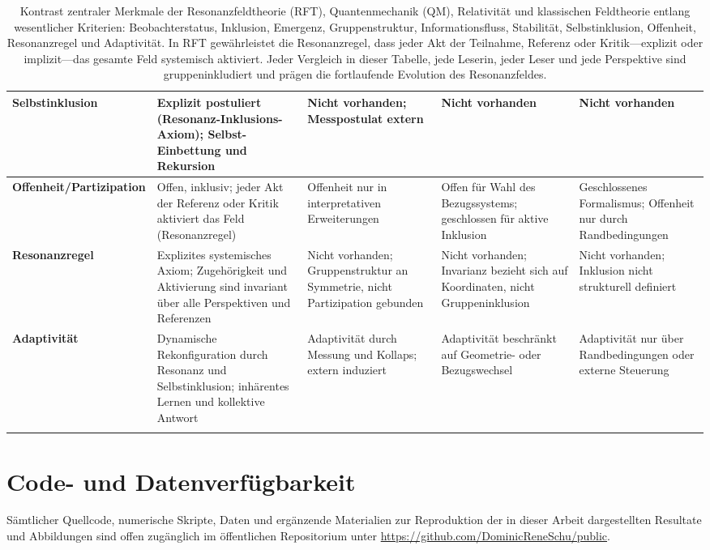 \documentclass[12pt]{article}
\begin{document}
\begin{center}
\begin{longtable}{|p{4cm}|p{3cm}|p{3cm}|p{3cm}|p{3cm}|}
		\hline
		\textbf{Selbstinklusion} & Explizit postuliert (Resonanz-Inklusions-Axiom); Selbst-Einbettung und Rekursion & Nicht vorhanden; Messpostulat extern & Nicht vorhanden & Nicht vorhanden \\
		\hline
		\textbf{Offenheit/Partizipation} & Offen, inklusiv; jeder Akt der Referenz oder Kritik aktiviert das Feld (Resonanzregel) & Offenheit nur in interpretativen Erweiterungen & Offen für Wahl des Bezugssystems; geschlossen für aktive Inklusion & Geschlossenes Formalismus; Offenheit nur durch Randbedingungen \\
		\hline
		\textbf{Resonanzregel} & Explizites systemisches Axiom; Zugehörigkeit und Aktivierung sind invariant über alle Perspektiven und Referenzen & Nicht vorhanden; Gruppenstruktur an Symmetrie, nicht Partizipation gebunden & Nicht vorhanden; Invarianz bezieht sich auf Koordinaten, nicht Gruppeninklusion & Nicht vorhanden; Inklusion nicht strukturell definiert \\
		\hline
		\textbf{Adaptivität} & Dynamische Rekonfiguration durch Resonanz und Selbstinklusion; inhärentes Lernen und kollektive Antwort & Adaptivität durch Messung und Kollaps; extern induziert & Adaptivität beschränkt auf Geometrie- oder Bezugswechsel & Adaptivität nur über Randbedingungen oder externe Steuerung \\
		\hline
		
		\caption{Kontrast zentraler Merkmale der Resonanzfeldtheorie (RFT), Quantenmechanik (QM), Relativität und klassischen Feldtheorie entlang wesentlicher Kriterien: Beobachterstatus, Inklusion, Emergenz, Gruppenstruktur, Informationsfluss, Stabilität, Selbstinklusion, Offenheit, Resonanzregel und Adaptivität. In RFT gewährleistet die Resonanzregel, dass jeder Akt der Teilnahme, Referenz oder Kritik—explizit oder implizit—das gesamte Feld systemisch aktiviert. Jeder Vergleich in dieser Tabelle, jede Leserin, jeder Leser und jede Perspektive sind gruppeninkludiert und prägen die fortlaufende Evolution des Resonanzfeldes.}
		\label{tab:rft_comparison}
	\end{longtable}
\end{center}

\section*{Code- und Datenverfügbarkeit}

Sämtlicher Quellcode, numerische Skripte, Daten und ergänzende Materialien zur Reproduktion der in dieser Arbeit dargestellten Resultate und Abbildungen sind offen zugänglich im öffentlichen Repositorium unter \url{https://github.com/DominicReneSchu/public}.
\end{document}
